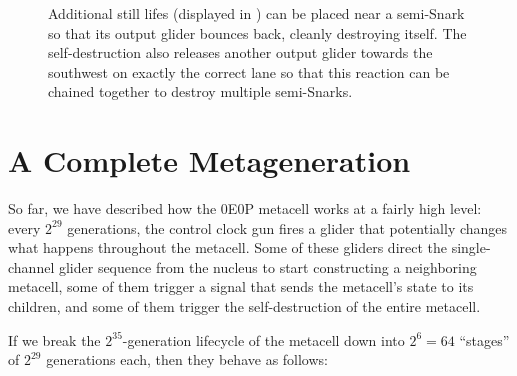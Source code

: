 \begin{figure}[!htb]
	\centering
	\caption{Additional still lifes (displayed in ) can be placed near a semi-Snark so that its output glider bounces back, cleanly destroying itself. The self-destruction also releases another output glider towards the southwest on exactly the correct lane so that this reaction can be chained together to destroy multiple semi-Snarks.}
	\label{fig:semi_snark_self_destruct}
\end{figure}


\section{A Complete Metageneration}\label{sec:0e0p_timeline}

So far, we have described how the 0E0P metacell works at a fairly high level: every $2^{29}$ generations, the control clock gun fires a glider that potentially changes what happens throughout the metacell. Some of these gliders direct the single-channel glider sequence from the nucleus to start constructing a neighboring metacell, some of them trigger a signal that sends the metacell's state to its children, and some of them trigger the self-destruction of the entire metacell.

If we break the $2^{35}$-generation lifecycle of the metacell down into $2^6 = 64$ ``stages'' of $2^{29}$ generations each, then they behave as follows:\smallskip

